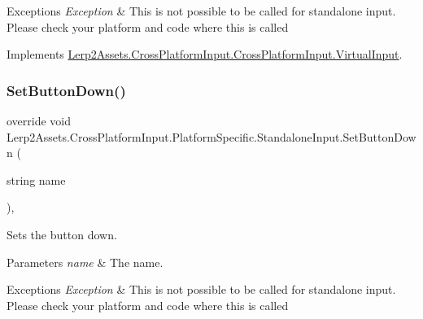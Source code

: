 \begin{DoxyExceptions}{Exceptions}
{\em Exception} & This is not possible to be called for standalone input. Please check your platform and code where this is called\\
\hline
\end{DoxyExceptions}


Implements \hyperlink{class_lerp2_assets_1_1_cross_platform_input_1_1_cross_platform_input_1_1_virtual_input_a2248ba83477a6911eb090f1d4b41d657}{Lerp2\+Assets.\+Cross\+Platform\+Input.\+Cross\+Platform\+Input.\+Virtual\+Input}.

\mbox{\label{class_lerp2_assets_1_1_cross_platform_input_1_1_platform_specific_1_1_standalone_input_a13ea072e40caff4862a5db57c90b3f74}} 
\subsubsection{\texorpdfstring{Set\+Button\+Down()}{SetButtonDown()}}
{\footnotesize\ttfamily override void Lerp2\+Assets.\+Cross\+Platform\+Input.\+Platform\+Specific.\+Standalone\+Input.\+Set\+Button\+Down (\begin{DoxyParamCaption}\item[{string}]{name }\end{DoxyParamCaption})\hspace{0.3cm}{\ttfamily [inline]}, {\ttfamily [virtual]}}



Sets the button down. 


\begin{DoxyParams}{Parameters}
{\em name} & The name.\\
\hline
\end{DoxyParams}

\begin{DoxyExceptions}{Exceptions}
{\em Exception} & This is not possible to be called for standalone input. Please check your platform and code where this is called\\
\hline
\end{DoxyExceptions}


